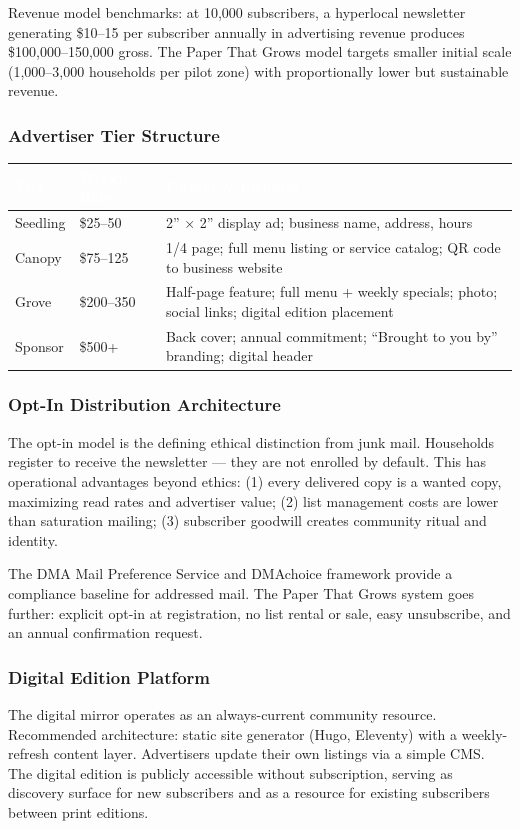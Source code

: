 \documentclass[11pt,letterpaper]{article}
\newcommand{\tableheader}[1]{\textbf{\sffamily\textcolor{white}{#1}}}
\begin{document}
Revenue model benchmarks: at 10,000 subscribers, a hyperlocal newsletter generating \$10--15 per subscriber annually in advertising revenue produces \$100,000--150,000 gross. The Paper That Grows model targets smaller initial scale (1,000--3,000 households per pilot zone) with proportionally lower but sustainable revenue.

\subsubsection{Advertiser Tier Structure}
\begin{center}
\begin{tabularx}{\textwidth}{L{2.5cm}C{2cm}X}
\toprule
{}
\tableheader{Tier} & \tableheader{Weekly Rate} & \tableheader{Format \& Includes} \\
\midrule
Seedling & \$25--50 & 2'' $\times$ 2'' display ad; business name, address, hours \\
Canopy & \$75--125 & 1/4 page; full menu listing or service catalog; QR code to business website \\
Grove & \$200--350 & Half-page feature; full menu + weekly specials; photo; social links; digital edition placement \\
Sponsor & \$500+ & Back cover; annual commitment; ``Brought to you by'' branding; digital header \\
\bottomrule
\end{tabularx}
\end{center}

\subsubsection{Opt-In Distribution Architecture}
The opt-in model is the defining ethical distinction from junk mail. Households register to receive the newsletter --- they are not enrolled by default. This has operational advantages beyond ethics: (1) every delivered copy is a wanted copy, maximizing read rates and advertiser value; (2) list management costs are lower than saturation mailing; (3) subscriber goodwill creates community ritual and identity.

The DMA Mail Preference Service and DMAchoice framework provide a compliance baseline for addressed mail. The Paper That Grows system goes further: explicit opt-in at registration, no list rental or sale, easy unsubscribe, and an annual confirmation request.

\subsubsection{Digital Edition Platform}
The digital mirror operates as an always-current community resource. Recommended architecture: static site generator (Hugo, Eleventy) with a weekly-refresh content layer. Advertisers update their own listings via a simple CMS. The digital edition is publicly accessible without subscription, serving as discovery surface for new subscribers and as a resource for existing subscribers between print editions.
\end{document}

